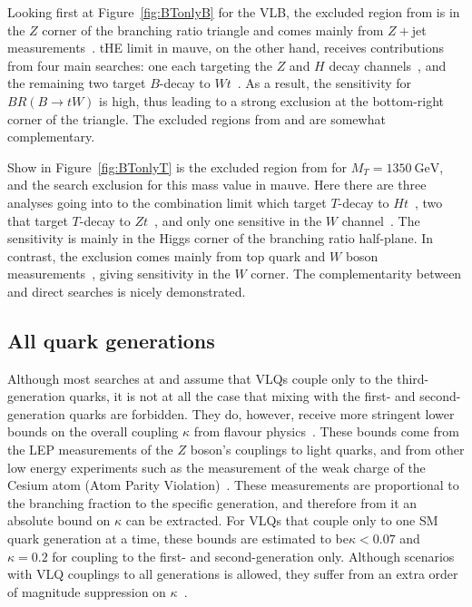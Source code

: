 Looking first at Figure~\ref{fig:BTonlyB} for the VLB, the excluded region from \contur is in the $Z$ corner of the branching ratio triangle and comes mainly from $Z+$jet measurements~\cite{Aad:2015auj,Aaboud:2017hox,Aaboud:2017hbk,Aaboud:2019jcc}. tHE \ATLAS limit in mauve, on the other hand, receives contributions from four main searches: one each targeting the $Z$ and $H$ decay channels~\cite{ZllSearch,HadSearch}, and the remaining two target $B$-decay to $Wt$~\cite{WtSearch,TriLepSearch}. As a result, the sensitivity for $BR(B\rightarrow tW)$ is high, thus leading to a strong exclusion at the bottom-right corner of the triangle. The excluded regions from \contur and \ATLAS are somewhat complementary. 

Show in Figure~\ref{fig:BTonlyT} is the excluded region from \contur for
$M_T = \SI{1350}{\GeV}$, and the \ATLAS search exclusion for this mass value in mauve. Here there are three analyses going into to the \ATLAS combination limit which target $T$-decay to $Ht$~\cite{HbbSearch,TriLepSearch,HadSearch}, two that target $T$-decay to $Zt$~\cite{ZnunuSearch,ZllSearch}, and only one sensitive in the $W$ channel~\cite{WbSearch}. The \ATLAS sensitivity is mainly in the Higgs corner of the branching ratio half-plane. In contrast, the \contur exclusion comes mainly from top quark and $W$ boson measurements~\cite{Aaboud:2017fye,Aaboud:2018eqg,Sirunyan:2018wem,Khachatryan:2016mnb,Sirunyan:2018ptc}, giving sensitivity in the $W$ corner. The complementarity between \contur and direct searches is nicely demonstrated. 

\subsection{All quark generations}
Although most searches at \ATLAS and \CMS assume that VLQs couple only to the third-generation quarks, it is not at all the case that mixing with the first- and second-generation quarks are forbidden. They do, however, receive more stringent lower bounds on the overall coupling $\kappa$ from flavour physics~\cite{Buchkremer_2013}. These bounds come from the LEP measurements of the $Z$ boson's couplings to light quarks, and from other low energy experiments such as the measurement of the weak charge of the Cesium atom (Atom Parity Violation)~\cite{}. These measurements are proportional to the branching fraction to the specific generation, and therefore from it an absolute bound on $\kappa$ can be extracted. For VLQs that couple only to one SM quark generation at a time, these bounds are estimated to be$\kappa<0.07$ and $\kappa=0.2$ for coupling to the first- and second-generation only. Although scenarios with VLQ couplings to all generations is allowed, they suffer from an extra order of magnitude suppression on $\kappa$~\cite{}. 

